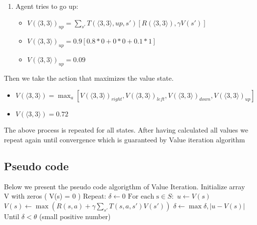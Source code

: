 \documentclass[10pt,a4paper,twocolumn]{article}
\begin{document}
\begin{enumerate}
		\item Agent tries to go up: 
		\begin{itemize}
			\item $V(\big \langle 3,3 \big \rangle)_{up} = \sum_{s'} T(\big \langle 3,3 \big \rangle, up, s') [R(\big \langle 3,3 \big \rangle), \gamma V(s')]
			$
		\end{itemize}
		\begin{itemize}
			\item $V(\big \langle 3,3 \big \rangle)_{up} = 0.9[0.8 * 0 + 0 * 0 + 0.1 * 1]$
		\end{itemize}
		\begin{itemize}
			\item $V(\big \langle 3,3 \big \rangle)_{up} = 0.09$
		\end{itemize}
	\end{enumerate}

	Then we take the action that maximizes the value state. 
		
	\begin{itemize}
		\item $V(\big \langle 3,3 \big \rangle) = \max_{a} [V(\big \langle 3,3 \big 
		\rangle)_{right},V(\big \langle 3,3 \big \rangle)_{left}, V(\big \langle 3,3 \big \rangle)_{down}, V(\big \langle 3,3 \big \rangle)_{up}]$
	\end{itemize}
		\begin{itemize}
		\item $V(\big \langle 3,3 \big \rangle) = 0.72$
	\end{itemize}
	The above process is repeated for all states. After having calculated all values we repeat again until convergence which is guaranteed by Value iteration algorithm
	\subsection{Pseudo code}
	Below we present the pseudo code algorigthm of Value Iteration.
	\newline
	Initialize array V with zeros ( V(s) = 0 )
	\newline
	Repeat:
	\newline
	$\delta \leftarrow 0$
	\newline
	$\text{For each s} \in S:$
	\newline
	$u \leftarrow V(s)$
	\newline
	$V(s) \leftarrow \max{ ( R(s,a) + \gamma \sum_{s'}T(s,a,s')V(s') )}$
	\newline
	$\delta \leftarrow \max{\delta, | u - V(s)|}$
	\newline
	Until $\delta < \theta$ (small positive number)
	
\end{document}
